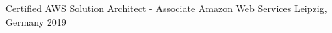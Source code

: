 


\begin{cvhonors}


\cvhonor
{Certified AWS Solution Architect - Associate} %
{Amazon Web Services} %
{Leipzig, Germany} %
{2019} %


\end{cvhonors}
